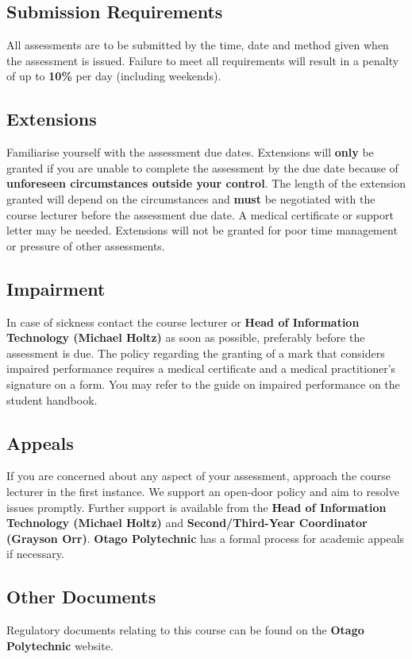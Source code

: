 \documentclass{article}
\begin{document}
\subsection*{Submission Requirements}
All assessments are to be submitted by the time, date and method given when the assessment is issued. Failure to meet all requirements will result in a penalty of up to \textbf{10\%} per day (including weekends).

\subsection*{Extensions}
Familiarise yourself with the assessment due dates. Extensions will \textbf{only} be granted if you are unable to complete the assessment by the due date because of \textbf{unforeseen circumstances outside your control}. The length of the extension granted will depend on the circumstances and \textbf{must} be negotiated with the course lecturer before the assessment due date. A medical certificate or support letter may be needed. Extensions will not be granted for poor time management or pressure of other assessments.

\subsection*{Impairment}
In case of sickness contact the course lecturer or \textbf{Head of Information Technology (Michael Holtz)} as soon as possible, preferably before the assessment is due. The policy regarding the granting of a mark that considers impaired performance requires a medical certificate and a medical practitioner’s signature on a form. You may refer to the guide on impaired performance on the student handbook.

\subsection*{Appeals}
If you are concerned about any aspect of your assessment, approach the course lecturer in the first instance. We support an open-door policy and aim to resolve issues promptly. Further support is available from the \textbf{Head of Information Technology (Michael Holtz)} and \textbf{Second/Third-Year Coordinator (Grayson Orr)}. \textbf{Otago Polytechnic} has a formal process for academic appeals if necessary.

\subsection*{Other Documents}
Regulatory documents relating to this course can be found on the \textbf{Otago Polytechnic} website.
\end{document}

